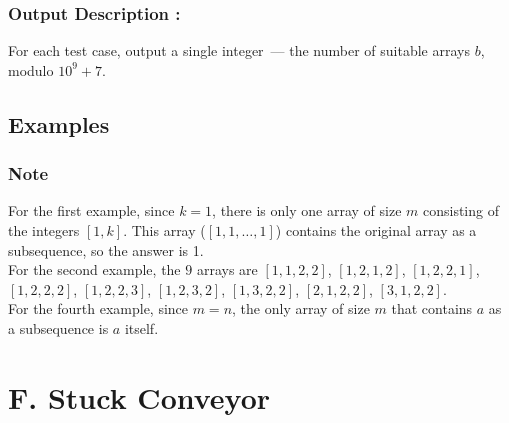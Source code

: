 \documentclass{article}
\begin{document}
\subsubsection*{Output Description : }For each test case, output a single integer — the number of suitable arrays $b$, modulo $10^9+7$.
\subsection*{Examples}
\subsubsection*{Note}For the first example, since $k=1$, there is only one array of size $m$ consisting of the integers $[1, k]$. This array ($[1, 1, \ldots, 1]$) contains the original array as a subsequence, so the answer is 1.\\ For the second example, the $9$ arrays are $[1, 1, 2, 2]$, $[1, 2, 1, 2]$, $[1, 2, 2, 1]$, $[1, 2, 2, 2]$, $[1, 2, 2, 3]$, $[1, 2, 3, 2]$, $[1, 3, 2, 2]$, $[2, 1, 2, 2]$, $[3, 1, 2, 2]$.\\ For the fourth example, since $m=n$, the only array of size $m$ that contains $a$ as a subsequence is $a$ itself.
\newpage
\section*{F. Stuck Conveyor}
\end{document}
